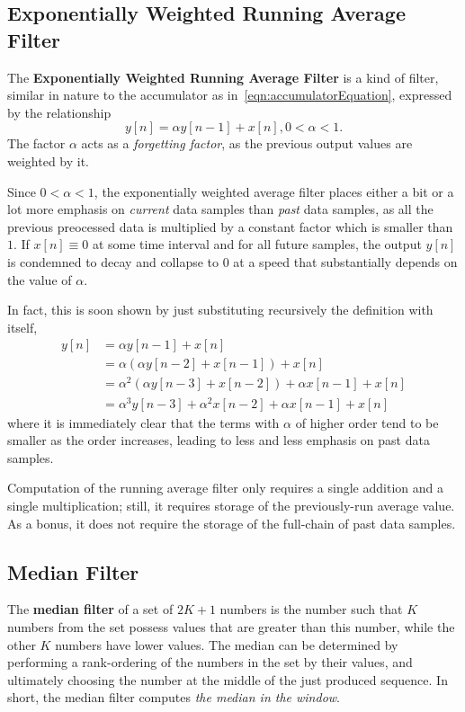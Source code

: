 \documentclass[\documentfontsize, twocolumn]{\classname}
\begin{document}
\subsection{Exponentially Weighted Running Average Filter}

The \textbf{Exponentially Weighted Running Average Filter} is a kind of filter, similar in nature to the accumulator as in~\ref{eqn:accumulatorEquation}, expressed by the relationship
\begin{equation}\label{eqn:exponentiallyWeightedRunningAverageFilterEquation}
    y[n] = \alpha y[n-1] + x[n], 0 < \alpha < 1.
\end{equation}
The factor $\alpha$ acts as a \emph{forgetting factor}, as the previous output values are weighted by it.

Since $0 < \alpha < 1$, the exponentially weighted average filter places either a bit or a lot more emphasis on \emph{current} data samples than \emph{past} data samples, as all the previous preocessed data is multiplied by a constant factor which is smaller than $1$. If $x[n]\equiv 0$ at some time interval and for all future samples, the output $y[n]$ is condemned to decay and collapse to $0$ at a speed that substantially depends on the value of $\alpha$.

In fact, this is soon shown by just substituting recursively the definition with itself,
\begin{align*}
    y[n] &= \alpha y[n-1] + x[n]\\
         &= \alpha(\alpha y[n-2] + x[n-1]) + x[n]\\
         &= \alpha^2(\alpha y[n-3] + x[n-2]) + \alpha x[n-1] + x[n]\\
         &= \alpha^3y[n-3] + \alpha^2 x[n-2] + \alpha x[n-1] + x[n]
\end{align*}
where it is immediately clear that the terms with $\alpha$ of higher order tend to be smaller as the order increases, leading to less and less emphasis on past data samples.

Computation of the running average filter only requires a single addition and a single multiplication; still, it requires storage of the previously-run average value. As a bonus, it does not require the storage of the full-chain of past data samples.

\subsection{Median Filter}

The \textbf{median filter} of a set of $2K+1$ numbers is the number such that $K$ numbers from the set possess values that are greater than this number, while the other $K$ numbers have lower values. The median can be determined by performing a rank-ordering of the numbers in the set by their values, and ultimately choosing the number at the middle of the just produced sequence. In short, the median filter computes \emph{the median in the window}.
\end{document}
